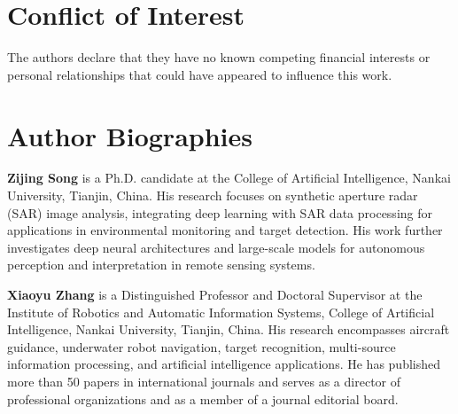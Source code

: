 \documentclass[preprint,12pt]{elsarticle}
\begin{document}
\section*{Conflict of Interest}
The authors declare that they have no known competing financial interests or personal relationships that could have appeared to influence this work.

\section*{Author Biographies}

\noindent\textbf{Zijing Song} is a Ph.D. candidate at the College of Artificial Intelligence, Nankai University, Tianjin, China. His research focuses on synthetic aperture radar (SAR) image analysis, integrating deep learning with SAR data processing for applications in environmental monitoring and target detection. His work further investigates deep neural architectures and large-scale models for autonomous perception and interpretation in remote sensing systems.

\bigskip

\noindent\textbf{Xiaoyu Zhang} is a Distinguished Professor and Doctoral Supervisor at the Institute of Robotics and Automatic Information Systems, College of Artificial Intelligence, Nankai University, Tianjin, China. His research encompasses aircraft guidance, underwater robot navigation, target recognition, multi-source information processing, and artificial intelligence applications. He has published more than 50 papers in international journals and serves as a director of professional organizations and as a member of a journal editorial board.
\end{document}
